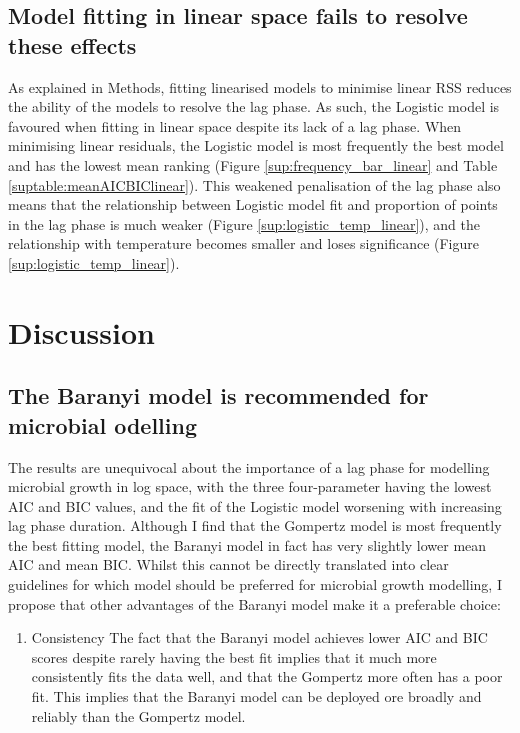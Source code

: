 \documentclass[11pt, a4paper]{article}
\begin{document}
\begin{linenumbers}
\subsection{Model fitting in linear space fails to resolve these effects}
As explained in Methods, fitting linearised models to minimise linear RSS reduces the ability of the models to resolve the lag phase. As such, the Logistic model is favoured when fitting in linear space despite its lack of a lag phase. When minimising linear residuals, the Logistic model is most frequently the best model and has the lowest mean ranking (Figure \ref{sup:frequency_bar_linear} and Table \ref{suptable:meanAICBIClinear}). This weakened penalisation of the lag phase also means that the relationship between Logistic model fit and proportion of points in the lag phase is much weaker (Figure \ref{sup:logistic_temp_linear}), and the relationship with temperature becomes smaller and loses significance (Figure \ref{sup:logistic_temp_linear}).



\section{Discussion}
\subsection{The Baranyi model is recommended for microbial odelling}
The results are unequivocal about the importance of a lag phase for modelling microbial growth in log space, with the three four-parameter having the lowest AIC and BIC values, and the fit of the Logistic model worsening with increasing lag phase duration. Although I find that the Gompertz model is most frequently the best fitting model, the Baranyi model in fact has very slightly lower mean AIC and mean BIC. Whilst this cannot be directly translated into clear guidelines for which model should be preferred for microbial growth modelling, I propose that other advantages of the Baranyi model make it a preferable choice:

\begin{enumerate}


\item{Consistency}
The fact that the Baranyi model achieves lower AIC and BIC scores despite rarely having the best fit implies that it much more consistently fits the data well, and that the Gompertz more often has a poor fit. This implies that the Baranyi model can be deployed ore broadly and reliably than the Gompertz model.


\end{enumerate}
\end{linenumbers}
\end{document}
